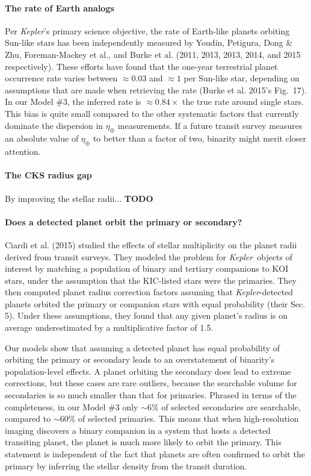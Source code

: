 \paragraph{The rate of Earth analogs}
Per {\it Kepler}'s primary science objective, the rate of Earth-like planets 
orbiting Sun-like stars has been independently measured by Youdin, Petigura, 
Dong \& Zhu, Foreman-Mackey et al., and Burke et al. (2011, 2013, 2013, 2014, 
and 2015 respectively).
These efforts have found that the one-year terrestrial planet occurrence rate 
varies between $\approx 0.03$ and $\approx 1$ per Sun-like star, depending on 
assumptions that are made when retrieving the rate (Burke et al. 2015's 
Fig.~17).
In our Model \#3, the inferred rate is $\approx 0.84\times$ the true rate 
around single stars.
This bias is quite small compared to the other systematic factors that 
currently dominate the dispersion in $\eta_\oplus$ measurements.
If a future transit survey measures an absolute value of $\eta_\oplus$ to 
better than a factor of two, binarity might merit closer attention.


\paragraph{The CKS radius gap}
By improving the stellar radii... {\bf TODO}


\paragraph{Does a detected planet orbit the primary or secondary?}
Ciardi et al. (2015) studied the effects of stellar multiplicity on the 
planet radii derived from transit surveys.
They modeled the problem for {\it Kepler}\ objects of interest by matching a 
population of binary and tertiary companions to KOI stars, 
under the assumption that the KIC-listed stars were the primaries.
They then computed planet radius correction factors assuming that {\it 
Kepler}-detected planets orbited the primary or companion stars
with equal probability (their Sec. 5).
Under these assumptions, they found that any given planet's radius is on 
average underestimated by a multiplicative factor of 1.5.

Our models show that assuming a detected planet has equal probability of 
orbiting the primary or secondary leads to an overstatement of
binarity's population-level effects.
A planet orbiting the secondary does lead to extreme corrections, but these 
cases are rare outliers, because the searchable volume for secondaries is so 
much smaller than that for primaries.
Phrased in terms of the completeness, in our Model \#3 only $\sim 6\%$ of 
selected secondaries are searchable, compared to $\sim 60\%$ of selected 
primaries.
This means that when high-resolution imaging discovers a binary companion in 
a system that hosts a detected transiting planet, the planet is much
more likely to orbit the primary.
This statement is independent of the fact that planets are often confirmed to 
orbit the primary by inferring the stellar density from the transit duration.


